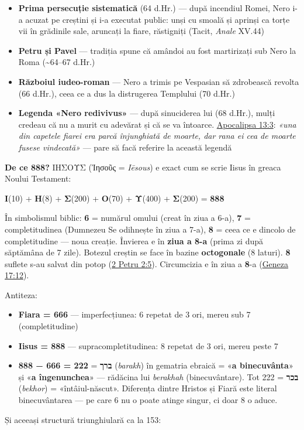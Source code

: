 \documentclass[12pt,a4paper,twoside,openany]{book}
\begin{document}
\begin{itemize}
  \item \textbf{Prima persecuție sistematică} (64 d.Hr.) — după incendiul Romei, Nero i-a acuzat pe creștini și i-a executat public: unși cu smoală și aprinși ca torțe vii în grădinile sale, aruncați la fiare, răstigniți (Tacit, \textit{Anale} XV.44)
  \item \textbf{Petru și Pavel} — tradiția spune că amândoi au fost martirizați sub Nero la Roma (\textasciitilde{}64–67 d.Hr.)
  \item \textbf{Războiul iudeo-roman} — Nero a trimis pe Vespasian să zdrobească revolta (66 d.Hr.), ceea ce a dus la distrugerea Templului (70 d.Hr.)
  \item \textbf{Legenda «Nero redivivus»} — după sinuciderea lui (68 d.Hr.), mulți credeau că nu a murit cu adevărat și că se va întoarce. \href{https://bibliaortodoxa.ro/carte.php?id=4\&cap=13\#3}{Apocalipsa 13:3}: \textit{«una din capetele fiarei era parcă înjunghiată de moarte, dar rana ei cea de moarte fusese vindecată»} — pare să facă referire la această legendă
\end{itemize}
\textbf{De ce 888?} ΙΗΣΟΥΣ (Ἰησοῦς = \textit{Iēsous}) e exact cum se scrie Iisus în greaca Noului Testament:

\textbf{Ι}(10) + \textbf{Η}(8) + \textbf{Σ}(200) + \textbf{Ο}(70) + \textbf{Υ}(400) + \textbf{Σ}(200) = \textbf{888}

În simbolismul biblic: \textbf{6} = numărul omului (creat în ziua a 6-a), \textbf{7} = completitudinea (Dumnezeu Se odihnește în ziua a 7-a), \textbf{8} = ceea ce e dincolo de completitudine — noua creație. Învierea e în \textbf{ziua a 8-a} (prima zi după săptămâna de 7 zile). Botezul creștin se face în bazine \textbf{octogonale} (8 laturi). \textbf{8} suflete s-au salvat din potop (\href{https://bibliaortodoxa.ro/carte.php?id=62\&cap=2\#5}{2 Petru 2:5}). Circumcizia e în ziua a \textbf{8}-a (\href{https://bibliaortodoxa.ro/carte.php?id=25\&cap=17\#12}{Geneza 17:12}).

Antiteza:

\begin{itemize}
  \item \textbf{Fiara = 666} — imperfecțiunea: 6 repetat de 3 ori, mereu sub 7 (completitudine)
  \item \textbf{Iisus = 888} — supracompletitudinea: 8 repetat de 3 ori, mereu peste 7
  \item \textbf{888 − 666 = 222} = \textbf{ברך} (\textit{barakh}) în gematria ebraică = «\textbf{a binecuvânta}» și «\textbf{a îngenunchea}» — rădăcina lui \textit{berakhah} (binecuvântare). Tot 222 = \textbf{בכר} (\textit{bekhor}) = «întâiul-născut». Diferența dintre Hristos și Fiară este literal binecuvântarea — pe care 6 nu o poate atinge singur, ci doar 8 o aduce.
\end{itemize}
Și aceeași structură triunghiulară ca la 153:
\end{document}
